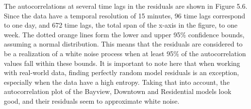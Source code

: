 \documentclass[12pt,oneside]{reedthesis}
\begin{document}
The autocorrelations at several time lags in the residuals are shown in
Figure 5.6. Since the data have a temporal resolution of 15 minutes, 96
time lags correspond to one day, and 672 time lags, the total span of
the x-axis in the figure, to one week. The dotted orange lines form the
lower and upper 95\% confidence bounds, assuming a normal distribution.
This means that the residuals are considered to be a realization of a
white noise process when at least 95\% of the autocorrelation values
fall within these bounds. It is important to note here that when working
with real-world data, finding perfectly random model residuals is an
exception, especially when the data have a high entropy. Taking that
into account, the autocorrelation plot of the Bayview, Downtown and
Residential models look good, and their residuals seem to approximate
white noise.
\end{document}
